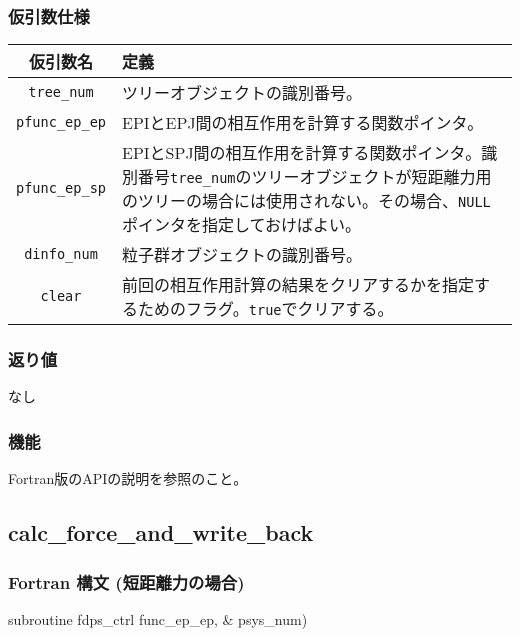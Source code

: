 \subsubsection*{仮引数仕様}
\begin{table}[h]
\begin{tabularx}{\linewidth}{cX}
\toprule
\rowcolor{Snow2}
仮引数名 & 定義 \\
\midrule
\verb|tree_num|    & ツリーオブジェクトの識別番号。\\
\verb|pfunc_ep_ep| & EPIとEPJ間の相互作用を計算する関数ポインタ。\\
\verb|pfunc_ep_sp| & EPIとSPJ間の相互作用を計算する関数ポインタ。識別番号\verb|tree_num|のツリーオブジェクトが短距離力用のツリーの場合には使用されない。その場合、\texttt{NULL}ポインタを指定しておけばよい。\\
\verb|dinfo_num|   & 粒子群オブジェクトの識別番号。\\
\verb|clear|       & 前回の相互作用計算の結果をクリアするかを指定するためのフラグ。\texttt{true}でクリアする。\\
\bottomrule
\end{tabularx}
\end{table}

\subsubsection*{返り値}
なし

\subsubsection*{機能}
Fortran版のAPIの説明を参照のこと。
\clearpage

\subsection{calc\_force\_and\_write\_back}
\subsubsection*{Fortran 構文 (短距離力の場合)}
\begin{screen}
\begin{spverbatim}
subroutine fdps_ctrl%
                                               func_ep_ep, &
                                               psys_num)
\end{spverbatim}
\end{screen}

